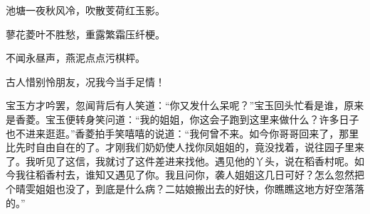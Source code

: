 池塘一夜秋风冷，吹散芰荷红玉影。

蓼花菱叶不胜愁，重露繁霜压纤梗。

不闻永昼声，燕泥点点污棋枰。

古人惜别怜朋友，况我今当手足情！

宝玉方才吟罢，忽闻背后有人笑道：``你又发什么呆呢？''宝玉回头忙看是谁，原来是香菱。宝玉便转身笑问道：``我的姐姐，你这会子跑到这里来做什么？许多日子也不进来逛逛。''香菱拍手笑嘻嘻的说道：``我何曾不来。如今你哥哥回来了，那里比先时自由自在的了。才刚我们奶奶使人找你凤姐姐的，竟没找着，说往园子里来了。我听见了这信，我就讨了这件差进来找他。遇见他的丫头，说在稻香村呢。如今我往稻香村去，谁知又遇见了你。我且问你，袭人姐姐这几日可好？怎么忽然把个晴雯姐姐也没了，到底是什么病？二姑娘搬出去的好快，你瞧瞧这地方好空落落的。''

